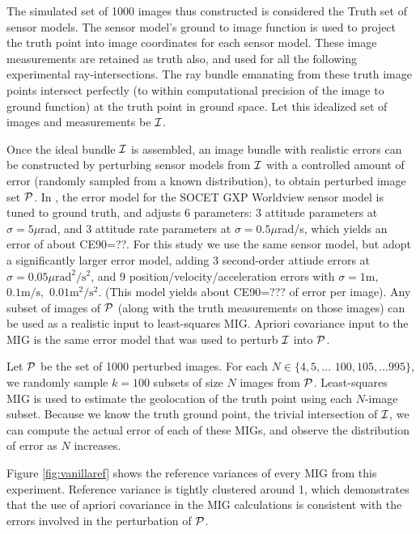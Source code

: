 \documentclass[11pt]{amsart}
\begin{document}
The simulated set of 1000 images thus constructed is considered the Truth set of
sensor models. The sensor model's ground to image function is used to project
the truth point into image coordinates for each sensor model. These image
measurements are retained as truth also, and used for all the following
experimental ray-intersections. The ray bundle emanating from these truth image
points intersect perfectly (to within computational precision of the image to
ground function) at the truth point in ground space. Let this idealized set of
images and measurements be $\mathcal{I}$.

Once the ideal bundle $\mathcal{I}$ is assembled, an image bundle with realistic
errors can be constructed by perturbing sensor models from $\mathcal{I}$ with a
controlled amount of error (randomly sampled from a known distribution), to
obtain perturbed image set $\mathcal{P}$. In \cite{MIN}, the error model for the SOCET
GXP Worldview sensor model is tuned to ground truth, and adjusts 6 parameters: 3
attitude parameters at $\sigma=5\mu$rad, and 3 attitude rate parameters at
$\sigma=0.5\mu$rad/s, which yields an error of about CE90=??. For this study we
use the same sensor model, but adopt a significantly larger error model, adding
3 second-order attiude errors at $\sigma=0.05\mu\mathrm{rad}^2/\mathrm{s}^2$,
and 9 position/velocity/ac\-cel\-eration errors with $\sigma = 1{\mathrm m},$
$0.1{\mathrm m}/{\mathrm s},$ $0.01{\mathrm m}^2/{\mathrm s}^2$. (This model
yields about CE90=??? of error per image). Any subset of images of $\mathcal{P}$
(along with the truth measurements on those images) can be used as a realistic
input to least-squares MIG. Apriori covariance input to the MIG is the same
error model that was used to perturb $\mathcal{I}$ into $\mathcal{P}$.

Let $\mathcal{P}$ be the set of 1000 perturbed images. For each
$N\in\{4,5,...$ $100,105,...995\}$, we randomly sample $k=100$ subsets of size
$N$ images from $\mathcal{P}$. Least-squares MIG is used to estimate the geolocation
of the truth point using each $N$-image subset. Because we know the truth ground
point, the trivial intersection of $\mathcal{I}$, we can compute the actual error of
each of these MIGs, and observe the distribution of error as $N$ increases.

Figure \ref{fig:vanillaref} shows the reference variances of every MIG from this
experiment. Reference variance is tightly clustered around 1, which demonstrates
that the use of apriori covariance in the MIG calculations is consistent with
the errors involved in the perturbation of $\mathcal{P}$.
\end{document}
